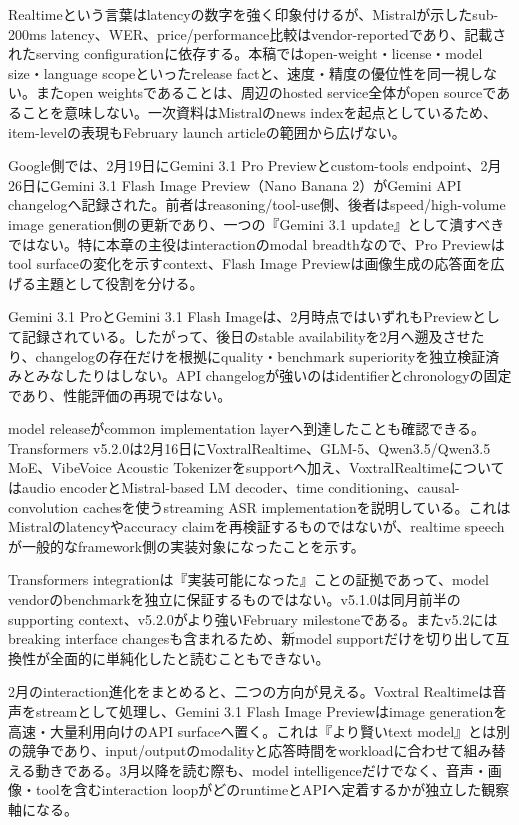 \begin{claimboundary}
Realtimeという言葉はlatencyの数字を強く印象付けるが、Mistralが示したsub-200ms latency、WER、price/performance比較はvendor-reportedであり、記載されたserving configurationに依存する。本稿ではopen-weight・license・model size・language scopeといったrelease factと、速度・精度の優位性を同一視しない。またopen weightsであることは、周辺のhosted service全体がopen sourceであることを意味しない。一次資料はMistralのnews indexを起点としているため、item-levelの表現もFebruary launch articleの範囲から広げない。\autocite{src-d8b7c1c36830}
\end{claimboundary}

Google側では、2月19日にGemini 3.1 Pro Previewとcustom-tools endpoint、2月26日にGemini 3.1 Flash Image Preview（Nano Banana 2）がGemini API changelogへ記録された。前者はreasoning/tool-use側、後者はspeed/high-volume image generation側の更新であり、一つの『Gemini 3.1 update』として潰すべきではない。特に本章の主役はinteractionのmodal breadthなので、Pro Previewはtool surfaceの変化を示すcontext、Flash Image Previewは画像生成の応答面を広げる主題として役割を分ける。\autocite{src-a24fd97eb3d0}


\begin{claimboundary}
Gemini 3.1 ProとGemini 3.1 Flash Imageは、2月時点ではいずれもPreviewとして記録されている。したがって、後日のstable availabilityを2月へ遡及させたり、changelogの存在だけを根拠にquality・benchmark superiorityを独立検証済みとみなしたりはしない。API changelogが強いのはidentifierとchronologyの固定であり、性能評価の再現ではない。\autocite{src-a24fd97eb3d0}
\end{claimboundary}

model releaseがcommon implementation layerへ到達したことも確認できる。Transformers v5.2.0は2月16日にVoxtralRealtime、GLM-5、Qwen3.5/Qwen3.5 MoE、VibeVoice Acoustic Tokenizerをsupportへ加え、VoxtralRealtimeについてはaudio encoderとMistral-based LM decoder、time conditioning、causal-convolution cachesを使うstreaming ASR implementationを説明している。これはMistralのlatencyやaccuracy claimを再検証するものではないが、realtime speechが一般的なframework側の実装対象になったことを示す。\autocite{src-0bd04783f97b,src-a43d64987293}


\begin{claimboundary}
Transformers integrationは『実装可能になった』ことの証拠であって、model vendorのbenchmarkを独立に保証するものではない。v5.1.0は同月前半のsupporting context、v5.2.0がより強いFebruary milestoneである。またv5.2にはbreaking interface changesも含まれるため、新model supportだけを切り出して互換性が全面的に単純化したと読むこともできない。\autocite{src-0bd04783f97b,src-a43d64987293}
\end{claimboundary}

2月のinteraction進化をまとめると、二つの方向が見える。Voxtral Realtimeは音声をstreamとして処理し、Gemini 3.1 Flash Image Previewはimage generationを高速・大量利用向けのAPI surfaceへ置く。これは『より賢いtext model』とは別の競争であり、input/outputのmodalityと応答時間をworkloadに合わせて組み替える動きである。3月以降を読む際も、model intelligenceだけでなく、音声・画像・toolを含むinteraction loopがどのruntimeとAPIへ定着するかが独立した観察軸になる。\autocite{src-a24fd97eb3d0,src-a43d64987293,src-d8b7c1c36830}

